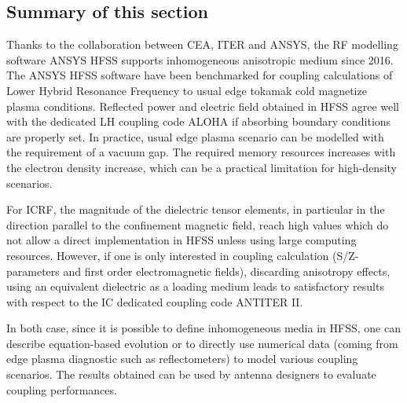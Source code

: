 
\subsection{Summary of this section}
Thanks to the collaboration between CEA, ITER and ANSYS, the RF modelling software ANSYS HFSS supports inhomogeneous anisotropic medium since 2016. The ANSYS HFSS software have been benchmarked for coupling calculations of Lower Hybrid Resonance Frequency to usual edge tokamak cold magnetize plasma conditions. Reflected power and electric field obtained in HFSS agree well with the dedicated LH coupling code ALOHA if absorbing boundary conditions are properly set. In practice, usual edge plasma scenario can be modelled with the requirement of a vacuum gap. The  required memory resources increases with the electron density increase, which can be a practical limitation for high-density scenarios.

For ICRF, the magnitude of the dielectric tensor elements, in particular in the direction parallel to the confinement magnetic field, reach high values which do not allow a direct implementation in HFSS unless using large computing resources. However, if one is only interested in coupling calculation (S/Z-parameters and first order electromagnetic fields), discarding anisotropy effects, using an equivalent dielectric as a loading medium leads to satisfactory results with respect to the IC dedicated coupling code ANTITER II. 

In both case, since it is possible to define inhomogeneous media in HFSS, one can describe equation-based evolution or to directly use numerical data (coming from edge plasma diagnostic such as reflectometers) to model various coupling scenarios. The results obtained can be used by antenna designers to evaluate coupling performances. 
